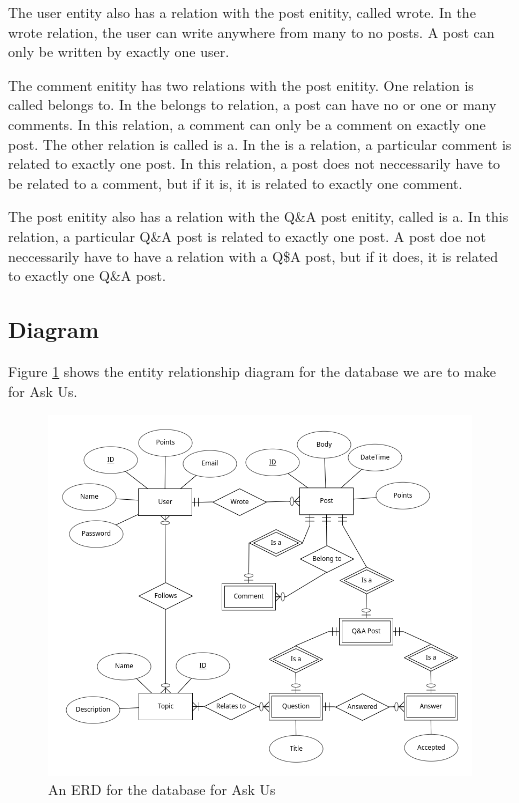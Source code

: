 The user entity also has a relation with the post enitity, called wrote. In the wrote relation, the user can write anywhere from many to no posts. A post can only be written by exactly one user.

The comment enitity has two relations with the post enitity. One relation is called belongs to. In the belongs to relation, a post can have no or one or many comments. In this relation, a comment can only be a comment on exactly one post. The other relation is called is a. In the is a relation, a particular comment is related to exactly one post. In this relation, a post does not neccessarily have to be related to a comment, but if it is, it is related to exactly one comment.

The post enitity also has a relation with the Q\&A post enitity, called is a. In this relation, a particular Q\&A post  is related to exactly one post. A post doe not neccessarily have to have a relation with a Q\$A post, but if it does, it is related to exactly one Q\&A post.


\subsection{Diagram}

Figure \ref{erd} shows the entity relationship diagram for the database we are to make for Ask Us.

\begin{figure}[htb]
	\centering
	\includegraphics[width=\linewidth]{../../ERD/erd.png}
	\caption{An ERD for the database for Ask Us}
	\label{erd}
\end{figure}
